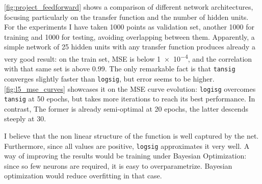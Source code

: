 \documentclass[a4paper, 10pt]{article}
\begin{document}
  \autoref{fig:project_feedforward} shows a comparison of different network
  architectures, focusing particularly on the transfer function and the number
  of hidden units. For the experiments I have taken 1000 points as validation 
  set, another 1000 for training and 1000 for testing, avoiding overlapping 
  between them. Apparently, a simple network of 25 hidden units with any
  transfer function produces already a very good result: on the train set, MSE
  is below \num{1e-4}, and the correlation with that same set is above 0.99.
  The only remarkable fact is that \texttt{tansig} converges slightly faster than
  \texttt{logsig}, but error seems to be higher. \autoref{fig:l5_mse_curves}
  showcases it on the MSE curve evolution: \texttt{logisg} overcomes \texttt{tansig}
  at 50 epochs, but takes more iterations to reach its best performance. In contrast,
  The former is already semi-optimal at 20 epochs, the latter descends steeply at 30.

  I believe that the non linear structure of the function is well captured by the 
  net. Furthermore, since all values are positive, \texttt{logsig}
  approximates it very well. A way of improving the results would be training
  under Bayesian Optimization: since so few neurons are required, it is easy
  to overparametrize. Bayesian optimization would reduce overfitting in that 
  case.
\end{document}
